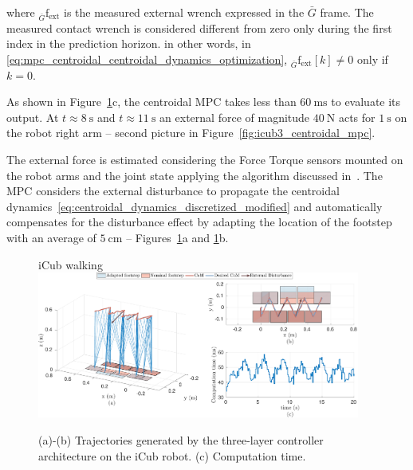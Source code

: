 where ${}_{\bar{G}} \mathrm{f}_\text{ext}$ is the measured external wrench expressed in the ${\bar{G}}$ frame. The measured contact wrench is considered different from zero only during the first index in the prediction horizon. in other words, in \eqref{eq:mpc_centroidal_centroidal_dynamics_optimization}, ${}_{\bar{G}} \mathrm{f}_\text{ext}[k] \ne 0$  only if $k = 0$.
\par
As shown in Figure~\ref{fig:icub_walking}c, the centroidal MPC takes less than $\SI{60}{\milli \second}$ to evaluate its output.
At $t \approx \SI{8}{\second}$ and $t\approx \SI{11}{\second}$ an external force of magnitude $\SI{40}{\newton}$ acts for $\SI{1}{\second}$ on the robot right arm -- second picture in Figure~\ref{fig:icub3_centroidal_mpc}.

The external force is estimated considering the Force Torque sensors mounted on the robot arms and the joint state applying the algorithm discussed in~\cite{Traversaro2017ModellingDynamics}. The MPC considers the external disturbance to propagate the centroidal dynamics~\eqref{eq:centroidal_dynamics_discretized_modified} and automatically compensates for the disturbance effect by adapting the location of the footstep with an average of $\SI{5}{\centi \meter}$ -- Figures~\ref{fig:icub_walking}a and \ref{fig:icub_walking}b.
\begin{figure}
    \centering
    \begin{myframe}{iCub walking}
    \includegraphics[width=0.945\textwidth]{chapter_centroidal_mpc/figures/icub_traj.pdf}
    \end{myframe}
    \caption{(a)-(b) Trajectories generated by the three-layer controller architecture on the iCub robot. (c) Computation time.}
    \label{fig:icub_walking}
\end{figure}